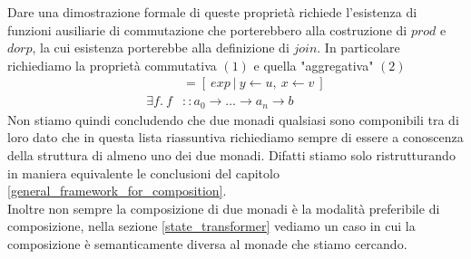 Dare una dimostrazione formale di queste proprietà richiede l'esistenza di funzioni
ausiliarie di commutazione che porterebbero alla costruzione di $prod$ e $dorp$, la cui
esistenza porterebbe alla definizione di $join$.
In particolare richiediamo la proprietà commutativa $(1)$ e quella "aggregativa" $(2)$
\begin{align}
  [\ exp\ |\ x \leftarrow v,\ y \leftarrow u\ ] &= [\ exp\ |\ y \leftarrow u,\ x \leftarrow v\ ]\\
  \exists f.\ f &:: a_0 \to \dots \to a_n \to b
\end{align}
Non stiamo quindi concludendo che due monadi qualsiasi sono componibili tra di loro
dato che in questa lista riassuntiva richiediamo sempre di essere a conoscenza della
struttura di almeno uno dei due monadi.
Difatti stiamo solo ristrutturando in maniera equivalente le conclusioni del capitolo
\ref{general_framework_for_composition}.\\
Inoltre non sempre la composizione di due monadi è la modalità preferibile di composizione,
nella sezione \ref{state_transformer} vediamo un caso in cui la composizione
è semanticamente diversa al monade che stiamo cercando.

\vfill